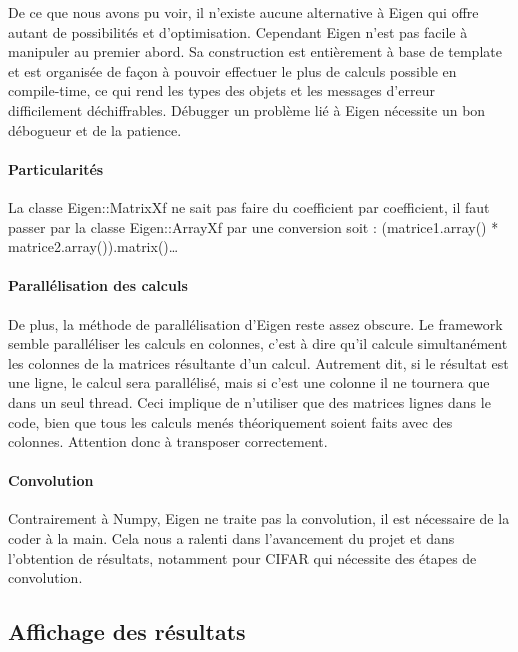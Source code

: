 De ce que nous avons pu voir, il n'existe aucune alternative à Eigen qui offre autant de possibilités et d'optimisation. Cependant Eigen n'est pas facile à manipuler au premier abord. Sa construction est entièrement à base de template et est organisée de façon à pouvoir effectuer le plus de calculs possible en compile-time, ce qui rend les types des objets et les messages d'erreur difficilement déchiffrables. Débugger un problème lié à Eigen nécessite un bon débogueur et de la patience. 

\paragraph{Particularités}
La classe Eigen::MatrixXf ne sait pas faire du coefficient par coefficient, il faut passer par la classe Eigen::ArrayXf par une conversion
soit : (matrice1.array() * matrice2.array()).matrix()…
\paragraph{Parallélisation des calculs}
De plus, la méthode de parallélisation d'Eigen reste assez obscure. Le framework semble paralléliser les calculs en colonnes, c'est à dire qu'il calcule simultanément les colonnes de la matrices résultante d'un calcul. Autrement dit, si le résultat est une ligne, le calcul sera parallélisé, mais si c'est une colonne il ne tournera que dans un seul thread. Ceci implique de n'utiliser que des matrices lignes dans le code, bien que tous les calculs menés théoriquement soient faits avec des colonnes. Attention donc à transposer correctement.
\paragraph{Convolution}
Contrairement à Numpy, Eigen ne traite pas la convolution, il est nécessaire de la coder à la main. Cela nous a ralenti dans l'avancement du projet et dans l'obtention de résultats, notamment pour CIFAR qui nécessite des étapes de convolution.



\subsection{Affichage des résultats}

